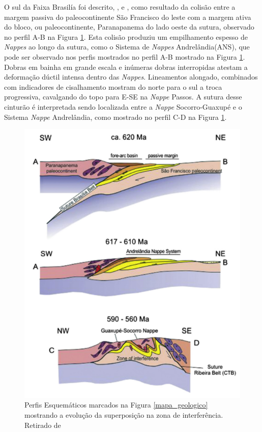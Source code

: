 O sul da Faixa Brasilía foi descrito, \cite{pimentel_tectonic_2011},\cite{reno_situ_2012} e \cite{trouw_new_2013}, como resultado da colisão entre a margem passiva do paleocontinente São Francisco do leste com a margem ativa do bloco, ou paleocontinente, Paranapanema do lado oeste da sutura, observado no perfil A-B na Figura \ref{perfil_esquematico}. Esta colisão produziu um empilhamento espesso de \textit{Nappes} ao longo da sutura, como o Sistema de \textit{Nappes} Andrelândia(ANS), que pode ser observado nos perfis mostrados no perfil A-B mostrado na Figura \ref{perfil_esquematico}. Dobras em bainha em grande escala e inúmeras dobras interropidas atestam a deformação dúctil intensa dentro das \textit{Nappes}. Lineamentos alongado, combinados com indicadores de cisalhamento mostram do norte para o sul a troca progressiva, cavalgando do topo para E-SE  na \textit{Nappe} Passos. A sutura desse cinturão é interpretada sendo localizada entre a \textit{Nappe} Socorro-Guaxupé e o Sistema \textit{Nappe} Andrelândia, como mostrado no perfil C-D na Figura \ref{perfil_esquematico}.

\begin{figure}[!ht]
\centering
\includegraphics[scale=0.7]{Figs/perfil_esquematico_area.png}
\caption[Perfis Esquemáticos da Região do Sudeste do Brasil segundo  \cite{trouw_new_2013}.]{Perfis Esquemáticos marcados na Figura \ref{mapa_geologico} mostrando a evolução da superposição na zona de interferência. Retirado de \cite{trouw_new_2013}}
\label{perfil_esquematico}
\end{figure} 


